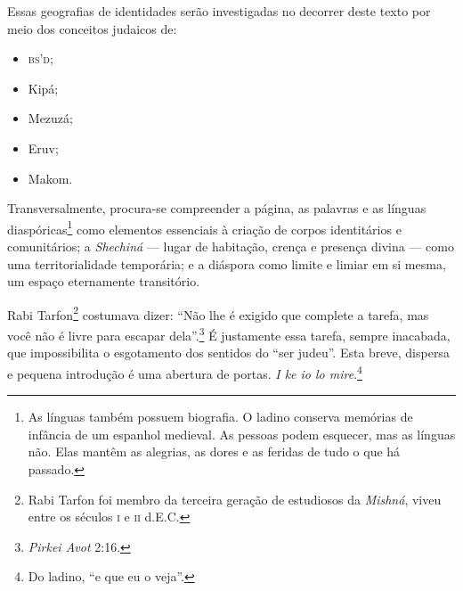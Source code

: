 Essas geografias de identidades serão investigadas no decorrer deste texto por meio dos conceitos judaicos de:

\begin{itemize}
\item \textsc{bs'd}; 
\item Kipá; 
\item Mezuzá; 
\item Eruv; 
\item Makom. 
\end{itemize}

Transversalmente, procura-se compreender a página, as palavras e as línguas diaspóricas\footnote{As línguas também possuem biografia. O ladino conserva memórias de infância de um espanhol medieval. As pessoas podem esquecer, mas as línguas não. Elas mantêm as alegrias, as dores e as feridas de tudo o que há passado.} como elementos essenciais à criação de corpos identitários e comunitários; a \emph{Shechiná} --- lugar de habitação, crença e presença divina --- como uma territorialidade temporária; e a diáspora como limite e limiar em si mesma, um espaço eternamente transitório.

Rabi Tarfon\footnote{Rabi Tarfon foi membro da terceira geração de estudiosos da \emph{Mishná}, viveu entre os séculos \textsc{i} e \textsc{ii} d.E.C.} costumava dizer: ``Não lhe é exigido que complete a tarefa, mas você não é livre para escapar dela''.\footnote{\emph{Pirkei Avot} 2:16.} É justamente essa tarefa, sempre inacabada, que impossibilita o esgotamento dos sentidos do ``ser judeu''. %
Esta breve, dispersa e pequena introdução é uma abertura de
portas. \emph{I ke io lo mire}.\footnote{Do ladino, ``e que eu o veja''.}